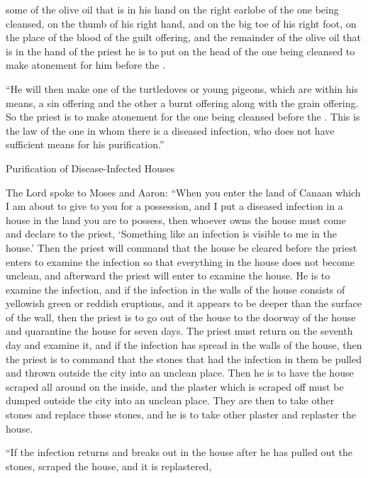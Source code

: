 {some of the olive oil
that
is in
his hand
on
the right
earlobe
of the one being cleansed,
on
the thumb
of his right
hand,
and on
the big toe
of his right
foot,
on
the place
of the blood
of the guilt offering,
and the remainder
of the olive oil
that
is in the hand
of the priest
he is to put
on
the head
of the one being cleansed
to make atonement
for him
before
the {}.
\par }{\PP {}“He will then make
one
of the turtledoves
or
young
pigeons,
which
are within his means,
a sin offering
and the
other
a burnt offering
along
with the grain offering.
So the priest
is to make atonement
for the one
being cleansed
before
the {}.
This
is the law
of the one in whom
there is a diseased
infection,
who
does not
have sufficient
means for his purification.”
\par }{\SH Purification of Disease-Infected Houses
\par }{\PP {}The Lord
spoke
to
Moses
and Aaron:
“When
you enter
the land
of Canaan
which
I am
about to give
to you for a possession,
and I put
a diseased
infection
in a house
in the land
you are to possess,
then
whoever
owns the house
must come
and declare
to the priest,
‘Something like an infection
is visible
to me in the house.’
Then the priest
will command
that
the
house
be cleared
before
the priest
enters
to examine
the infection
so that
everything
in the house
does not
become unclean,
and afterward
the priest
will enter
to examine
the
house.
He is to examine
the infection,
and if the infection
in the walls
of the house
consists of yellowish green
or
reddish
eruptions,
and it appears
to be deeper
than
the surface of the wall,
then the priest
is to go out
of the house
to
the doorway
of the house
and quarantine
the
house
for seven
days.
The priest
must return
on
the seventh
day
and examine
it, and if the infection
has spread
in the walls
of the house,
then the priest
is to command
that the stones
that had
the infection
in them be pulled
and thrown
outside
the city
into
an unclean
place.
Then
he is to have the house
scraped
all around
on the inside,
and the plaster
which
is scraped off
must be dumped
outside
the city
into
an unclean
place.
They are then to take
other
stones
and replace
those stones,
and he is to take
other
plaster
and replaster
the house.
\par }{\PP {}“If
the infection
returns
and breaks
out in the house
after
he has pulled
out the stones,
scraped
the house,
and it is replastered,
}
